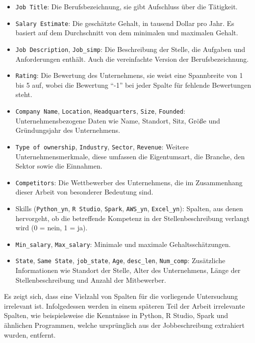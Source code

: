\documentclass[
]{article}
\providecommand{\tightlist}{%
  \setlength{\itemsep}{0pt}\setlength{\parskip}{0pt}}
\begin{document}
\begin{itemize}
\tightlist
\item
  \texttt{Job\ Title}: Die Berufsbezeichnung, sie gibt Aufschluss über
  die Tätigkeit.
\item
  \texttt{Salary\ Estimate}: Die geschätzte Gehalt, in tausend Dollar
  pro Jahr. Es basiert auf dem Durchschnitt von dem minimalen und
  maximalen Gehalt.
\item
  \texttt{Job\ Description}, \texttt{Job\_simp}: Die Beschreibung der
  Stelle, die Aufgaben und Anforderungen enthält. Auch die vereinfachte
  Version der Berufsbezeichnung.
\item
  \texttt{Rating}: Die Bewertung des Unternehmens, sie weist eine
  Spannbreite von 1 bis 5 auf, wobei die Bewertung ``-1'' bei jeder
  Spalte für fehlende Bewertungen steht.
\item
  \texttt{Company\ Name}, \texttt{Location}, \texttt{Headquarters},
  \texttt{Size}, \texttt{Founded}: Unternehmensbezogene Daten wie Name,
  Standort, Sitz, Größe und Gründungsjahr des Unternehmens.
\item
  \texttt{Type\ of\ ownership}, \texttt{Industry}, \texttt{Sector},
  \texttt{Revenue}: Weitere Unternehmensmerkmale, diese umfassen die
  Eigentumsart, die Branche, den Sektor sowie die Einnahmen.
\item
  \texttt{Competitors}: Die Wettbewerber des Unternehmens, die im
  Zusammenhang dieser Arbeit von besonderer Bedeutung sind.
\item
  Skills (\texttt{Python\_yn}, \texttt{R\ Studio}, \texttt{Spark},
  \texttt{AWS\_yn}, \texttt{Excel\_yn}): Spalten, aus denen hervorgeht,
  ob die betreffende Kompetenz in der Stellenbeschreibung verlangt wird
  (0 = nein, 1 = ja).
\item
  \texttt{Min\_salary}, \texttt{Max\_salary}: Minimale und maximale
  Gehaltsschätzungen.
\item
  \texttt{State}, \texttt{Same\ State}, \texttt{job\_state},
  \texttt{Age}, \texttt{desc\_len}, \texttt{Num\_comp}: Zusätzliche
  Informationen wie Standort der Stelle, Alter des Unternehmens, Länge
  der Stellenbeschreibung und Anzahl der Mitbewerber.
\end{itemize}

Es zeigt sich, dass eine Vielzahl von Spalten für die vorliegende
Untersuchung irrelevant ist. Infolgedessen werden in einem späteren Teil
der Arbeit irrelevante Spalten, wie beispielsweise die Kenntnisse in
Python, R Studio, Spark und ähnlichen Programmen, welche ursprünglich
aus der Jobbeschreibung extrahiert wurden, entfernt.
\end{document}
